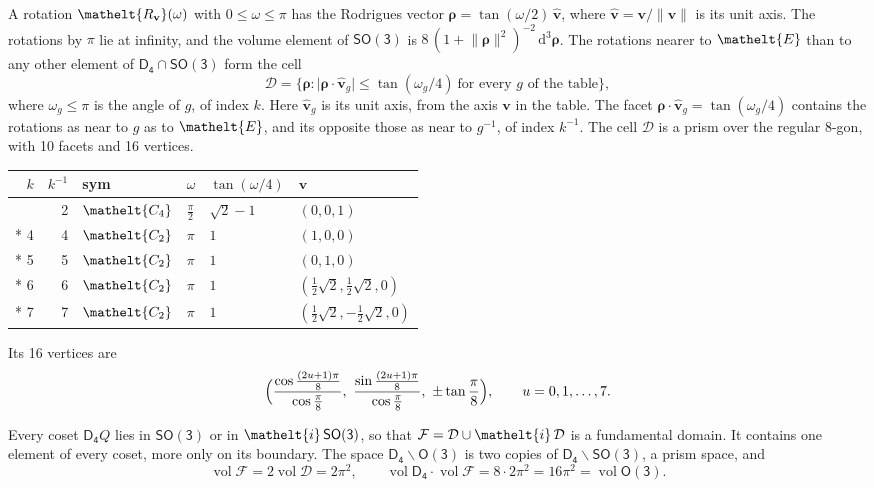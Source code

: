 \documentclass[10pt,a4paper]{article}
\numberwithin{equation}{section}
\newcommand{\eltfont}[1]{{\let\sigma\eltsigma\mathelt{#1}}}
\newcommand{\grp}[1]{\mathsf{#1}}
\newcommand{\cls}[1]{\eltfont{#1}}
\newcommand{\elt}[1]{\eltfont{#1}}
\newcommand{\dirvec}[3]{(#1, #2, #3)}
\newcommand{\unitaxis}{\hat{\mathbf{v}}}
\newcommand{\vv}{\mathbf{v}}
\newcommand{\diff}{\mathrm{d}}
\newcommand{\vol}{\operatorname{vol}}
\newcommand{\rodrigues}{\boldsymbol{\rho}}
\newcommand{\fcell}{\mathcal{D}}
\newcommand{\fdomain}{\mathcal{F}}
\begin{document}
\leavevmode\label{n:vector.rodrigues}\label{n:vector.unitaxis}A rotation $\elt{R_{\vv}}(\omega)$ with $0 \le \omega \le \pi$ has the Rodrigues vector $\rodrigues = \tan(\omega/2)\,\unitaxis$, where $\unitaxis = \vv/\lVert\vv\rVert$ is its unit axis. The rotations by $\pi$ lie at infinity, and the volume element of \href{SO3.pdf}{$\grp{SO(3)}$} is $8\,(1 + \lVert\rodrigues\rVert^2)^{-2}\,\diff^3\rodrigues$.
\leavevmode\label{n:set.cell}The rotations nearer to $\elt{E}$ than to any other element of $\grp{D_{4}} \cap \grp{SO(3)}$ form the cell
\begin{equation}\label{e:cell}\fcell = \bigl\{\rodrigues : \lvert\rodrigues\cdot\unitaxis_g\rvert \le \tan(\omega_g/4)\ \text{for every $g$ of the table}\bigr\},\end{equation}
where $\omega_g \le \pi$ is the angle of $g$, of index $k$. Here $\unitaxis_g$ is its unit axis, from the axis $\vv$ in the table. The facet $\rodrigues\cdot\unitaxis_g = \tan(\omega_g/4)$ contains the rotations as near to $g$ as to $\elt{E}$, and its opposite those as near to $g^{-1}$, of index $k^{-1}$. The cell $\fcell$ is a prism over the regular 8-gon, with 10 facets and 16 vertices.
{\small{\renewcommand{\arraystretch}{1.3}\begin{longtable}{@{}rrllll@{}}\toprule
$k$ & $k^{-1}$ & sym & $\omega$ & $\tan(\omega/4)$ & $\vv$\\\midrule\endhead
\bottomrule\endfoot\endlastfoot
1 & 2 & $\cls{C_{4}}$ & $\tfrac{\pi}{2}$ & $\sqrt{2} - 1$ & $\dirvec{0}{0}{1}$\\*
4 & 4 & $\cls{C_{2}}$ & $\pi$ & $1$ & $\dirvec{1}{0}{0}$\\*
5 & 5 & $\cls{C_{2}}$ & $\pi$ & $1$ & $\dirvec{0}{1}{0}$\\*
6 & 6 & $\cls{C_{2}}$ & $\pi$ & $1$ & $\dirvec{\tfrac{1}{2}\sqrt{2}}{\tfrac{1}{2}\sqrt{2}}{0}$\\*
7 & 7 & $\cls{C_{2}}$ & $\pi$ & $1$ & $\dirvec{\tfrac{1}{2}\sqrt{2}}{-\tfrac{1}{2}\sqrt{2}}{0}$\\
\bottomrule\end{longtable}}}
\leavevmode\label{n:local.vertex.u}Its 16 vertices are
\begin{equation}\label{e:prism}\Bigl(\frac{\cos\frac{(2u+1)\pi}{8}}{\cos\frac{\pi}{8}},\ \frac{\sin\frac{(2u+1)\pi}{8}}{\cos\frac{\pi}{8}},\ \pm\tan\frac{\pi}{8}\Bigr),\qquad u = 0, 1, \dots, 7.\end{equation}

\leavevmode\label{n:set.fundamental}Every coset $\grp{D_{4}}Q$ lies in \href{SO3.pdf}{$\grp{SO(3)}$} or in $\elt{i}\,\grp{SO(3)}$, so that $\fdomain = \fcell \cup \elt{i}\,\fcell$ is a fundamental domain. It contains one element of every coset, more only on its boundary.
The space $\grp{D_{4}}\backslash\grp{O(3)}$ is two copies of $\grp{D_{4}}\backslash\grp{SO(3)}$, a prism space, and
\begin{equation}\label{e:volume}\vol\fdomain = 2\vol\fcell = 2\pi^2,\qquad \vol\grp{D_{4}}\cdot\vol\fdomain = 8\cdot 2\pi^2 = 16\pi^2 = \vol\grp{O(3)}.\end{equation}
\end{document}
